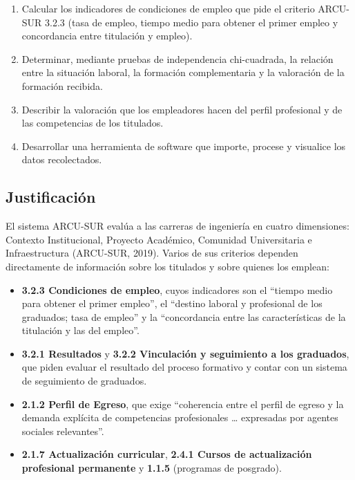 \documentclass[12pt, a4paper]{article}
\begin{document}
\begin{enumerate}
  \item Calcular los indicadores de condiciones de empleo que pide el
  criterio ARCU-SUR 3.2.3 (tasa de empleo, tiempo medio para obtener el
  primer empleo y concordancia entre titulación y empleo).
  \item Determinar, mediante pruebas de independencia chi-cuadrada, la
  relación entre la situación laboral, la formación complementaria y la
  valoración de la formación recibida.
  \item Describir la valoración que los empleadores hacen del perfil
  profesional y de las competencias de los titulados.
  \item Desarrollar una herramienta de software que importe, procese y
  visualice los datos recolectados.
\end{enumerate}

\subsection{Justificación}

El sistema ARCU-SUR evalúa a las carreras de ingeniería en cuatro
dimensiones: Contexto Institucional, Proyecto Académico, Comunidad
Universitaria e Infraestructura (ARCU-SUR, 2019). Varios de sus
criterios dependen directamente de información sobre los titulados y
sobre quienes los emplean:

\begin{itemize}
  \item \textbf{3.2.3 Condiciones de empleo}, cuyos indicadores son el
  ``tiempo medio para obtener el primer empleo'', el ``destino laboral y
  profesional de los graduados; tasa de empleo'' y la ``concordancia
  entre las características de la titulación y las del empleo''.
  \item \textbf{3.2.1 Resultados} y \textbf{3.2.2 Vinculación y
  seguimiento a los graduados}, que piden evaluar el resultado del
  proceso formativo y contar con un sistema de seguimiento de
  graduados.
  \item \textbf{2.1.2 Perfil de Egreso}, que exige ``coherencia entre el
  perfil de egreso y la demanda explícita de competencias profesionales
  \ldots{} expresadas por agentes sociales relevantes''.
  \item \textbf{2.1.7 Actualización curricular}, \textbf{2.4.1 Cursos de
  actualización profesional permanente} y \textbf{1.1.5} (programas de
  posgrado).
\end{itemize}
\end{document}
